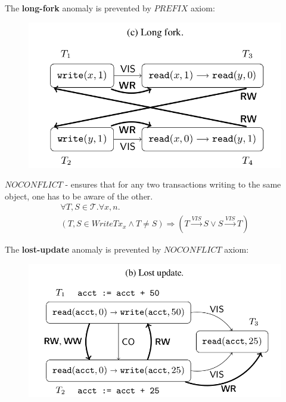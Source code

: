 \documentclass{beamer}
\begin{document}
\begin{frame}
	The \textbf{long-fork} anomaly is prevented by $PREFIX$ axiom:
	\begin{figure}
		\includegraphics[scale=0.3]{fig2c}
	\end{figure}
\end{frame}

\begin{frame}
	$NOCONFLICT$ - ensures that for any two transactions writing to the same object, one has to be aware of the other.
	\begin{multline*}
	\forall T,S \in \mathcal{T}. \forall x,n . \\
	\left( T,S \in WriteTx_x \wedge T \ne S \right)
	\Rightarrow
	\left( T \overset{VIS}{\longrightarrow} S \vee S \overset{VIS}{\longrightarrow} T \right)
	\end{multline*}
\end{frame}

\begin{frame}
	The \textbf{lost-update} anomaly is prevented by $NOCONFLICT$ axiom:
	\begin{figure}
		\includegraphics[scale=0.3]{fig2b}
	\end{figure}
\end{frame}
\end{document}
